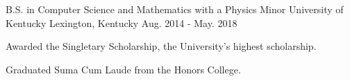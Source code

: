 

\begin{cventries}

  \cventry
    {B.S. in Computer Science and Mathematics with a Physics Minor} %
    {University of Kentucky} %
    {Lexington, Kentucky} %
    {Aug. 2014 - May. 2018} %
    {
      \begin{cvitems} %
        \item {Awarded the Singletary Scholarship, the University's highest scholarship.}
	\item {Graduated Suma Cum Laude from the Honors College.}
      \end{cvitems}
    }

\end{cventries}

